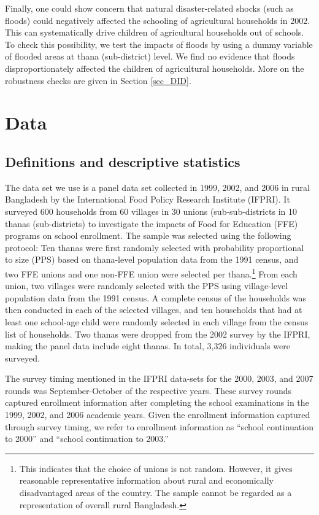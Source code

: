 \documentclass[12pt,letterpaper]{article}
\newcommand{\0}{\ensuremath{\mbox{\boldmath $0$}}}
\begin{document}
Finally, one could show concern that natural disaster-related shocks (such as floods) could negatively affected the schooling of agricultural households in 2002. This can systematically drive children of agricultural households out of schools. To check this possibility, we test the impacts of floods by using a dummy variable of flooded areas at thana (sub-district) level. We find no evidence that floods disproportionately affected the children of agricultural households. More on the robustness checks are given in Section \ref{sec_DID}. 

 \section{Data} 
\subsection{Definitions and descriptive statistics}

The data set we use is a panel data set collected in 1999, 2002, and 2006 in rural Bangladesh by the International Food Policy Research Institute (IFPRI). It surveyed 600 households from 60 villages in 30 unions (sub-sub-districts in 10 thanas (sub-districts) to investigate the impacts of Food for Education (FFE) programs on school enrollment. The sample was selected using the following protocol: Ten thanas were first randomly selected with probability proportional to size (PPS) based on thana-level population data from the 1991 census, and two FFE unions and one non-FFE union were selected per thana.\footnote{This indicates that the choice of unions is not random. However, it gives reasonable representative information about rural and economically disadvantaged areas of the country. The sample cannot be regarded as a representation of overall rural Bangladesh.} From each union, two villages were randomly selected with the PPS using village-level population data from the 1991 census. A complete census of the households was then conducted in each of the selected villages, and ten households that had at least one school-age child were randomly selected in each village from the census list of households. Two thanas were dropped from the 2002 survey by the IFPRI, making the panel data include eight thanas. In total, 3,326 individuals were surveyed. 

The survey timing mentioned in the IFPRI data-sets for the 2000, 2003, and 2007 rounds was September-October of the respective years. These survey rounds captured enrollment information after completing the school examinations in the 1999, 2002, and 2006 academic years. Given the enrollment information captured through survey timing, we refer to enrollment information as ``school continuation to 2000'' and ``school continuation to 2003.''
\end{document}
